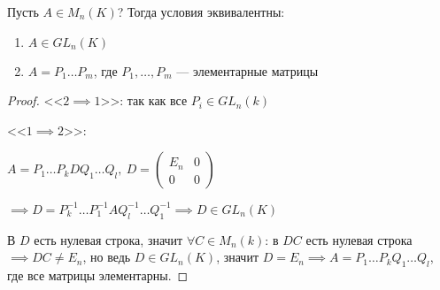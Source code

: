 \begin{follow}
    Пусть $A \in M_n(K)$? Тогда условия эквивалентны:

    \begin{enumerate}
        \item $A \in GL_n(K)$
        
        \item $A = P_1 \ldots P_m$, где $P_1, \ldots, P_m$ --- элементарные матрицы
    \end{enumerate}
\end{follow}

\begin{proof}

    <<$2 \implies 1$>>: так как все $P_i \in GL_n(k)$

    <<$1 \implies 2$>>: 

    $A = P_1 \ldots P_k D Q_1 \ldots Q_l,~ D = \begin{pmatrix}
        E_n & 0 \\
        0 & 0
    \end{pmatrix}$

    $\implies D = P_k^{-1} \ldots P_1^{-1} A Q_l^{-1} \ldots Q_1^{-1} \implies D \in GL_n(K)$

    В $D$ есть нулевая строка, значит $\forall C \in M_n(k)$: в $DC$ есть нулевая строка $\implies DC \neq E_n$, но ведь $D \in GL_n(K)$, значит $D = E_n \implies A = P_1 \ldots P_k Q_1 \ldots Q_l$, где все матрицы элементарны.
\end{proof}